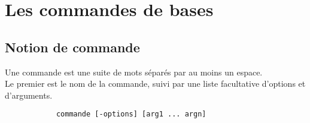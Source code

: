 \part{Les commandes de bases}
	\chapter{Notion de commande}
		Une commande est une suite de mots séparés par au moins un espace.\\
		Le premier est le nom de la commande, suivi par une liste facultative d'options et d'arguments.
		\begin{verbatim}	
			commande [-options] [arg1 ... argn]
		\end{verbatim}

